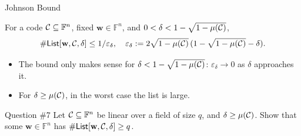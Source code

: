 \documentclass{zkdl-presentation-template}
\begin{document}
    \begin{frame}{Johnson Bound}
        \begin{theorem}
            For a code $\mathcal{C} \subseteq \mathbb{F}^n$, fixed $\mathbf{w} \in \mathbb{F}^n$, and $0 < \delta < 1-\sqrt{1-\mu(\mathcal{C})}$,
            \begin{equation*}
                \#\mathsf{List}[\mathbf{w},\mathcal{C},\delta] \leq 1/\varepsilon_{\delta}, \quad \varepsilon_{\delta} := 2\sqrt{1-\mu(\mathcal{C})}\,(1-\sqrt{1-\mu(\mathcal{C})}-\delta).
            \end{equation*}
        \end{theorem}
        \pause

        \begin{itemize}
            \item The bound only makes sense for $\delta < 1-\sqrt{1-\mu(\mathcal{C})}$: $\varepsilon_{\delta} \to 0$ as $\delta$ approaches it.\pause
            \item For $\delta \geq \mu(\mathcal{C})$, in the worst case the list is large.
        \end{itemize}
        \pause

        \begin{questionblock}{Question \#7}
            Let $\mathcal{C} \subseteq \mathbb{F}^n$ be linear over a field of size $q$, and $\delta \geq \mu(\mathcal{C})$. Show that some $\mathbf{w} \in \mathbb{F}^n$ has $\#\mathsf{List}[\mathbf{w}, \mathcal{C}, \delta] \geq q$.
        \end{questionblock}
    \end{frame}
\end{document}
